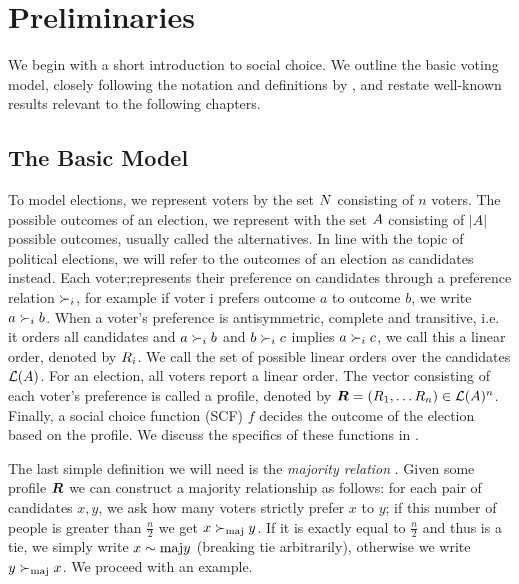 \chapter{Preliminaries}
\label{chap: preliminaries}

We begin with a short introduction to social choice. We outline the basic
voting model, closely following the notation and definitions by
\citet{brandtHandbookComputationalSocial2016}, and restate well-known results
relevant to the following chapters.

\section{The Basic Model}

To model elections, we represent voters by the set $N$ consisting of $n$
voters. The possible outcomes of an election, we represent with the set
$A$ consisting of $|A|$ possible outcomes, usually called the alternatives. In line with the topic of political elections, we will
refer to the outcomes of an election as candidates instead. Each voter;represents
their preference on candidates through a preference relation $\succ_i$, for
example if voter i prefers outcome $a$ to outcome $b$, we write $a \succ_i b$.
When a voter's preference is antisymmetric, complete and transitive, i.e. it orders
all candidates and $a \succ_i b$ and $b \succ_i c$ implies $a \succ_i c$, we
call this a linear order, denoted by $R_i$. We call the set of possible linear orders over the
candidates $\mathcal{L}(A)$.  For an election, all voters report a
linear order. The vector consisting of each voter's preference is called a
profile, denoted by $\boldsymbol{R} = (R_1, \dots R_{n}) \in \mathcal{L}(A)^{n}$. Finally, a social choice function (SCF)
$f$ decides the outcome of the election based on the profile. We discuss the
specifics of these functions in .

The last simple definition we will need is the \emph{majority relation}
\cite{alma990028050780205131}. Given some profile $\boldsymbol{R}$ we can
construct a majority relationship as follows: for each pair of candidates
$x,y$, we ask how many voters strictly prefer $x$ to $y$; if this number of people is
greater than $\frac{n}{2}$ we get $x  \succ_{\textnormal{maj}} y$. If it is exactly equal to
$\frac{n}{2}$ and thus is a tie, we simply write $x \sim{\textnormal{maj}} y$ (breaking tie arbitrarily), otherwise we write $y \succ_{\textnormal{maj}} x$. We proceed with an
example.

